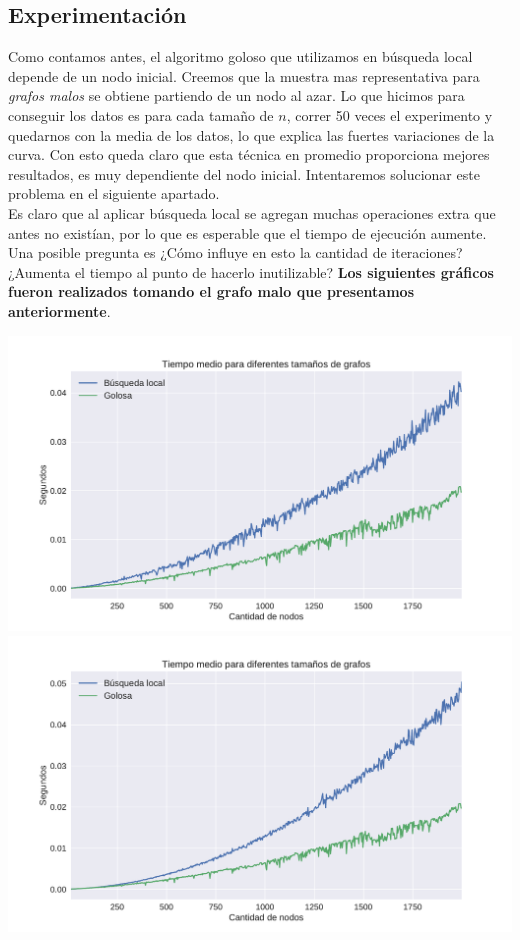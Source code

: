 \subsection{Experimentación}

Como contamos antes, el algoritmo goloso que utilizamos en búsqueda local depende de un nodo inicial. Creemos que la muestra mas representativa para \textit{grafos malos} se obtiene partiendo de un nodo al azar. Lo que hicimos para conseguir los datos es para cada tamaño de $n$, correr 50 veces el experimento y quedarnos con la media de los datos, lo que explica las fuertes variaciones de la curva. Con esto queda claro que esta técnica en promedio proporciona mejores resultados, es muy dependiente del nodo inicial. Intentaremos solucionar este problema en el siguiente apartado. \\

Es claro que al aplicar búsqueda local se agregan muchas operaciones extra que antes no existían, por lo que es esperable que el tiempo de ejecución aumente. Una posible pregunta es ¿Cómo influye en esto la cantidad de iteraciones? ¿Aumenta el tiempo al punto de hacerlo inutilizable? \textbf{Los siguientes gráficos fueron realizados tomando el grafo malo que presentamos anteriormente}.

{\centering
    \includegraphics[width=1\textwidth]{informe/imgs/exp_malo_tiempo_greedy_local.pdf}
}
{\centering
    \includegraphics[width=1\textwidth]{informe/imgs/exp_malo_tiempo_greedy_local_2000.pdf}
}
$ $\newline

